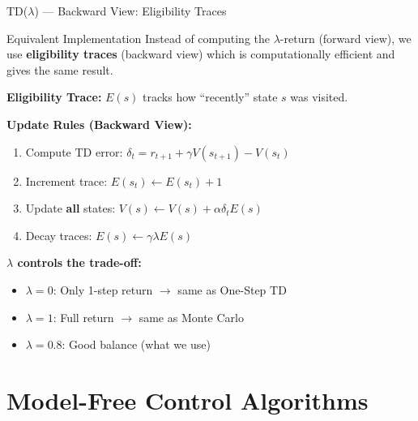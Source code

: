 \documentclass[aspectratio=169]{beamer}
\begin{document}
\begin{frame}{TD($\lambda$) --- Backward View: Eligibility Traces}
    \begin{block}{Equivalent Implementation}
        Instead of computing the $\lambda$-return (forward view), we use \textbf{eligibility traces} (backward view) which is computationally efficient and gives the same result.
    \end{block}

    \vspace{0.2cm}

    \textbf{Eligibility Trace:} $E(s)$ tracks how ``recently'' state $s$ was visited.

    \vspace{0.2cm}

    \textbf{Update Rules (Backward View):}
    \begin{enumerate}
        \item Compute TD error: $\delta_t = r_{t+1} + \gamma V(s_{t+1}) - V(s_t)$
        \item Increment trace: $E(s_t) \leftarrow E(s_t) + 1$
        \item Update \textbf{all} states: $V(s) \leftarrow V(s) + \alpha \delta_t E(s)$
        \item Decay traces: $E(s) \leftarrow \gamma \lambda E(s)$
    \end{enumerate}

    \vspace{0.2cm}

    \textbf{$\lambda$ controls the trade-off:}
    \begin{itemize}
        \item $\lambda = 0$: Only 1-step return $\rightarrow$ same as One-Step TD
        \item $\lambda = 1$: Full return $\rightarrow$ same as Monte Carlo
        \item $\lambda = 0.8$: Good balance (what we use)
    \end{itemize}
\end{frame}

\section{Model-Free Control Algorithms}
\end{document}
